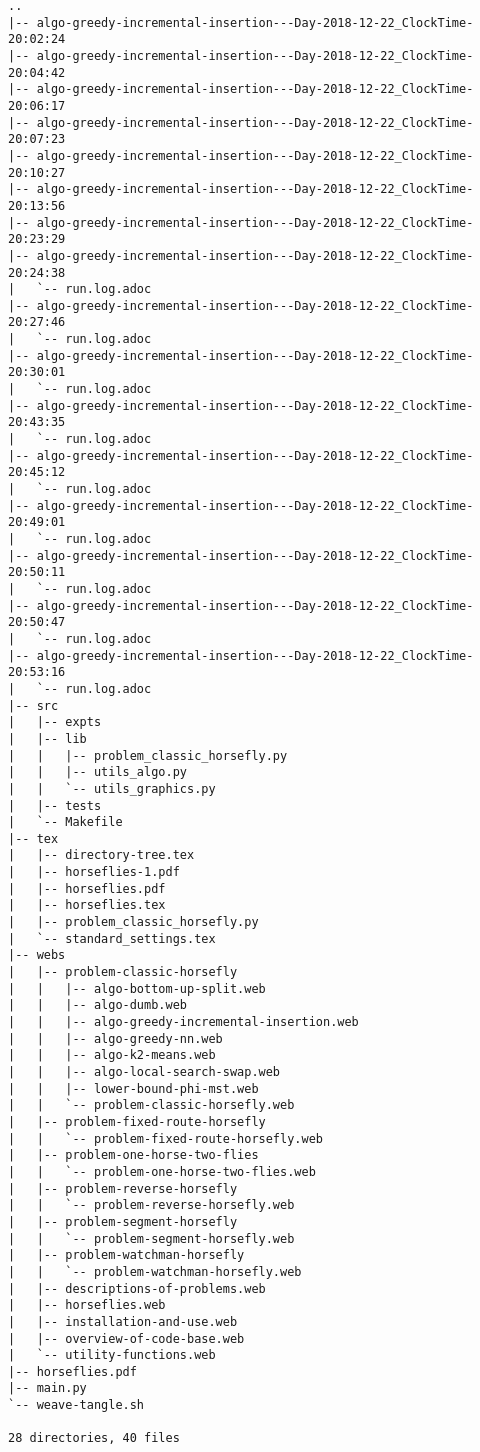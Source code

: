 \begin{verbatim}
..
|-- algo-greedy-incremental-insertion---Day-2018-12-22_ClockTime-20:02:24
|-- algo-greedy-incremental-insertion---Day-2018-12-22_ClockTime-20:04:42
|-- algo-greedy-incremental-insertion---Day-2018-12-22_ClockTime-20:06:17
|-- algo-greedy-incremental-insertion---Day-2018-12-22_ClockTime-20:07:23
|-- algo-greedy-incremental-insertion---Day-2018-12-22_ClockTime-20:10:27
|-- algo-greedy-incremental-insertion---Day-2018-12-22_ClockTime-20:13:56
|-- algo-greedy-incremental-insertion---Day-2018-12-22_ClockTime-20:23:29
|-- algo-greedy-incremental-insertion---Day-2018-12-22_ClockTime-20:24:38
|   `-- run.log.adoc
|-- algo-greedy-incremental-insertion---Day-2018-12-22_ClockTime-20:27:46
|   `-- run.log.adoc
|-- algo-greedy-incremental-insertion---Day-2018-12-22_ClockTime-20:30:01
|   `-- run.log.adoc
|-- algo-greedy-incremental-insertion---Day-2018-12-22_ClockTime-20:43:35
|   `-- run.log.adoc
|-- algo-greedy-incremental-insertion---Day-2018-12-22_ClockTime-20:45:12
|   `-- run.log.adoc
|-- algo-greedy-incremental-insertion---Day-2018-12-22_ClockTime-20:49:01
|   `-- run.log.adoc
|-- algo-greedy-incremental-insertion---Day-2018-12-22_ClockTime-20:50:11
|   `-- run.log.adoc
|-- algo-greedy-incremental-insertion---Day-2018-12-22_ClockTime-20:50:47
|   `-- run.log.adoc
|-- algo-greedy-incremental-insertion---Day-2018-12-22_ClockTime-20:53:16
|   `-- run.log.adoc
|-- src
|   |-- expts
|   |-- lib
|   |   |-- problem_classic_horsefly.py
|   |   |-- utils_algo.py
|   |   `-- utils_graphics.py
|   |-- tests
|   `-- Makefile
|-- tex
|   |-- directory-tree.tex
|   |-- horseflies-1.pdf
|   |-- horseflies.pdf
|   |-- horseflies.tex
|   |-- problem_classic_horsefly.py
|   `-- standard_settings.tex
|-- webs
|   |-- problem-classic-horsefly
|   |   |-- algo-bottom-up-split.web
|   |   |-- algo-dumb.web
|   |   |-- algo-greedy-incremental-insertion.web
|   |   |-- algo-greedy-nn.web
|   |   |-- algo-k2-means.web
|   |   |-- algo-local-search-swap.web
|   |   |-- lower-bound-phi-mst.web
|   |   `-- problem-classic-horsefly.web
|   |-- problem-fixed-route-horsefly
|   |   `-- problem-fixed-route-horsefly.web
|   |-- problem-one-horse-two-flies
|   |   `-- problem-one-horse-two-flies.web
|   |-- problem-reverse-horsefly
|   |   `-- problem-reverse-horsefly.web
|   |-- problem-segment-horsefly
|   |   `-- problem-segment-horsefly.web
|   |-- problem-watchman-horsefly
|   |   `-- problem-watchman-horsefly.web
|   |-- descriptions-of-problems.web
|   |-- horseflies.web
|   |-- installation-and-use.web
|   |-- overview-of-code-base.web
|   `-- utility-functions.web
|-- horseflies.pdf
|-- main.py
`-- weave-tangle.sh

28 directories, 40 files
\end{verbatim}
